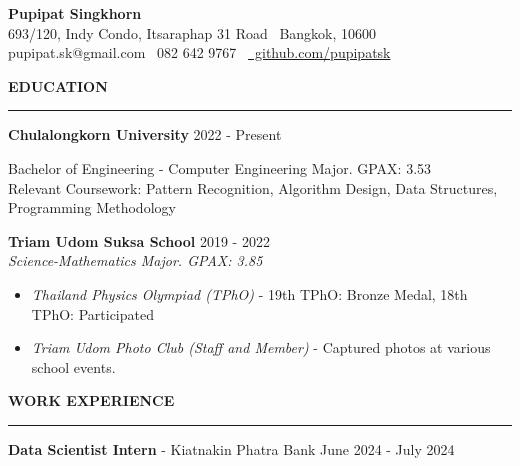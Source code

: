 \documentclass[11pt]{article}
\begin{document}
\begin{center}
    {\Large \textbf{Pupipat Singkhorn}}\\
    693/120, Indy Condo, Itsaraphap 31 Road \textbullet \ Bangkok, 10600 \\
    pupipat.sk@gmail.com \textbullet \ 082 642 9767 \textbullet\ \href{https://github.com/pupipatsk}{\faGithub\ github.com/pupipatsk}
\end{center}
\textbf{EDUCATION}
\vspace{5pt}
{\color{NavyBlue}\hrule}
\vspace{6pt}

\textbf{Chulalongkorn University} \hfill 2022 - Present

\hspace*{7pt} Bachelor of Engineering - Computer Engineering Major. GPAX: 3.53\\
\hspace*{7pt} Relevant Coursework: Pattern Recognition, Algorithm Design, Data Structures, Programming Methodology

\vspace{2pt}

\textbf{Triam Udom Suksa School} \hfill 2019 - 2022\\
\textit{Science-Mathematics Major. GPAX: 3.85}

\begin{itemize}[noitemsep, topsep=0pt, partopsep=0pt, parsep=0pt]
    \item \textit{Thailand Physics Olympiad (TPhO)} - 19th TPhO: Bronze Medal, 18th TPhO: Participated
    \item \textit{Triam Udom Photo Club (Staff and Member)} - Captured photos at various school events.
\end{itemize}

\vspace{9pt}
\textbf{WORK EXPERIENCE}
\vspace{5pt}
{\color{NavyBlue}\hrule}
\vspace{6pt}

\textbf{Data Scientist Intern} - Kiatnakin Phatra Bank \hfill June 2024 - July 2024
\end{document}
